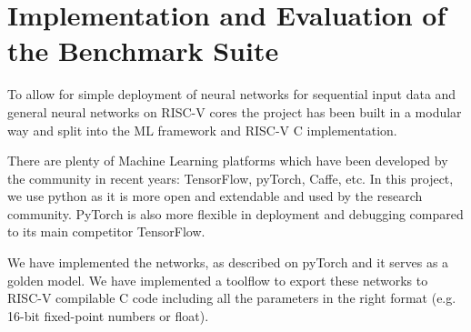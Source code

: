 
\section{Implementation and Evaluation of the Benchmark Suite}
To allow for simple deployment of neural networks for sequential input data and general neural networks on RISC-V cores the project has been built in a modular way and split into the ML framework and RISC-V C implementation. 

There are plenty of Machine Learning platforms which have been developed by the community in recent years: TensorFlow, pyTorch, Caffe, etc. In this project, we use python as it is more open and extendable and used by the research community. PyTorch is also more flexible in deployment and debugging compared to its main competitor TensorFlow.

We have implemented the networks, as described on pyTorch and it serves as a golden model. We have implemented a toolflow to export these networks to RISC-V compilable C code including all the parameters in the right format (e.g. 16-bit fixed-point numbers or float).

